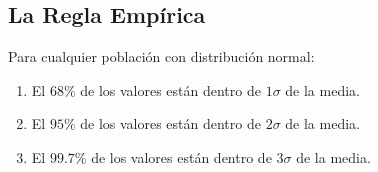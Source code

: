 \documentclass[a4paper]{article}
\begin{document}
\subsection{La Regla Empírica}

Para cualquier población con distribución normal:
\begin{enumerate}
    \item El $68\%$ de los valores están dentro de $1\sigma$ de la media.
    \item El $95\%$ de los valores están dentro de $2\sigma$ de la media.
    \item El $99.7\%$ de los valores están dentro de $3\sigma$ de la media.
\end{enumerate}




 
\end{document}
